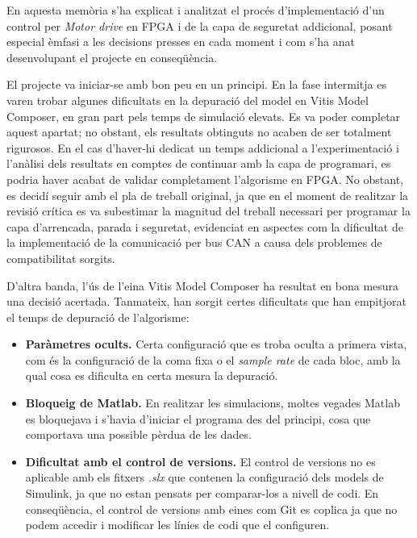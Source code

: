 En aquesta memòria s'ha explicat i analitzat el procés d'implementació d'un
control per \emph{Motor drive} en FPGA i de la capa de seguretat addicional,
posant especial èmfasi a les decisions presses en cada moment i com s'ha anat
desenvolupant el projecte en conseqüència. 

El projecte va iniciar-se amb bon peu en un principi. En la fase
intermitja es varen trobar algunes dificultats en la depuració del model en
Vitis Model Composer, en gran part pels temps de simulació elevats. Es va poder
completar aquest apartat; no obstant, els resultats obtinguts no acaben de ser
totalment rigurosos. En el cas d'haver-hi dedicat un temps addicional a
l'experimentació i l'anàlisi dels resultats en comptes de continuar amb la capa
de programari, es podria haver acabat de validar completament l'algorisme en
FPGA. No obstant, es decidí seguir amb el pla de treball original, ja que en el
moment de realitzar la revisió crítica es va subestimar la magnitud del treball
necessari per programar la capa d'arrencada, parada i seguretat, evidenciat en
aspectes com la dificultat de la implementació de la comunicació per bus CAN a
causa dels problemes de compatibilitat sorgits.

D'altra banda, l'ús de l'eina Vitis Model Composer ha resultat en bona mesura una
decisió acertada. Tanmateix, han sorgit certes dificultats que han empitjorat
el temps de depuració de l'algorisme:

\begin{itemize}

    \item \textbf{Paràmetres ocults.}
        Certa configuració que es troba oculta a primera vista, com és la
        configuració de la coma fixa o el \emph{sample rate} de cada bloc, amb
        la qual cosa es dificulta en certa mesura la depuració.

    \item \textbf{Bloqueig de Matlab.} 
        En realitzar les simulacions, moltes vegades Matlab es bloquejava i
        s'havia d'iniciar el programa des del principi, cosa que comportava una
        possible pèrdua de les dades.

    \item \textbf{Dificultat amb el control de versions.}
        El control de versions no es aplicable amb els fitxers \emph{.slx} que
        contenen la configuració dels models de Simulink, ja que no estan
        pensats per comparar-los a nivell de codi. En conseqüència, el
        control de versions amb eines com Git es coplica ja que no podem
        accedir i modificar les línies de codi que el configuren.

\end{itemize}

